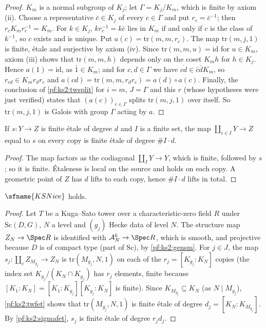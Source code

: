 \begin{proof}
$K_m$ is a normal subgroup of $K_j$; let $\Gamma=K_j/K_m$, which is finite by axiom (ii). Choose a
representative $\bar c\in K_j$ of every $c\in\Gamma$ and put $r_c=\bar c^{-1}$; then
$r_cK_mr_c^{-1}=K_m$. For $k\in K_j$, $kr_c^{-1}=k\bar c$ lies in $K_m$ if and only if $c$ is the class
of $k^{-1}$, so $c$ exists and is unique. Put $a(c)=\mathrm{tr}(m,m,r_c)$. The map $\mathrm{tr}(m,j,1)$
is finite, \'etale and surjective by axiom (iv). Since $\mathrm{tr}(m,m,u)=\mathrm{id}$ for $u\in K_m$,
axiom (iii) shows that $\mathrm{tr}(m,m,h)$ depends only on the coset $K_mh$ for $h\in K_j$. Hence
$a(1)=\mathrm{id}$, as $\bar1\in K_m$; and for $c,d\in\Gamma$ we have $\overline{cd}\in\bar c\bar dK_m$,
so $r_{cd}\in K_mr_dr_c$ and $a(cd)=\mathrm{tr}(m,m,r_dr_c)=a(d)\circ a(c)$. Finally, the conclusion
of \cref{pf:ks2:twsplit} for $i=m$, $J=\Gamma$ and this $r$ (whose hypotheses were just verified)
states that $(a(c))_{c\in\Gamma}$ splits $\mathrm{tr}(m,j,1)$ over itself. So $\mathrm{tr}(m,j,1)$ is
Galois with group $\Gamma$ acting by $a$.
\end{proof}

\begin{lemma}\label{pf:ks2:sigmafet}
If $s\colon Y\to Z$ is finite \'etale of degree $d$ and $I$ is a finite set, the map
$\coprod_{i\in I}Y\to Z$ equal to $s$ on every copy is finite \'etale of degree $\#I\cdot d$.
\end{lemma}

\begin{proof}
The map factors as the codiagonal $\coprod_IY\to Y$, which is finite, followed by $s$; so it is
finite. \'Etaleness is local on the source and holds on each copy. A geometric point of $Z$ has $d$
lifts to each copy, hence $\#I\cdot d$ lifts in total.
\end{proof}

\begin{proposition}\label{pf:ks2:ksnice}
$\sfname{KSNice}$ holds.
\end{proposition}

\begin{proof}
Let $T$ be a Kuga--Sato tower over a characteristic-zero field $R$ under $\mathrm{Sc}(D,G)$, $N$ a
level and $(g_j)$ Hecke data of level $N$. The structure map
$Z_N\to\Spec R$ is identified with $\kstwoKS_N^k\to\Spec R$, which is smooth, and projective because
$D$ is of compact type (part of $\mathrm{Sc}$), by \cref{pf:ks2:gensm}. For $j\in J$, the map
$s_j\colon\coprod_{c}Z_{M_{g_j}}\to Z_N$ is $\mathrm{tr}(M_{g_j},N,1)$ on each of the
$r_j=[K_{g_j}:K_N]$ copies (the index set $K_{g_j}/(K_N\cap K_{g_j})$ has $r_j$ elements, finite
because $[K_1:K_N]=[K_1:K_{g_j}][K_{g_j}:K_N]$ is finite). Since $K_{M_{g_j}}\subseteq K_N$
(as $N\mid M_{g_j}$), \cref{pf:ks2:twfet} shows that $\mathrm{tr}(M_{g_j},N,1)$ is finite \'etale of
degree $d_j=[K_N:K_{M_{g_j}}]$. By \cref{pf:ks2:sigmafet}, $s_j$ is
finite \'etale of degree $r_jd_j$.
\end{proof}

